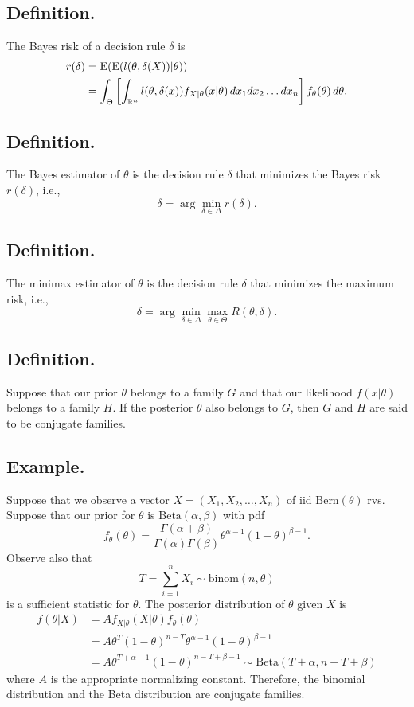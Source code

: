 \documentclass[titlepage]{article}
\begin{document}
\subsection{Definition.} The Bayes risk of a decision rule $\delta$ is 
\begin{align*}
    r(\delta) &= \text{E}(\text{E}(l(\theta, \delta(X))|\theta)) \\
              &= \int_{\Theta}\left[\int_{\mathbb{R}^{n}}l(\theta, \delta(x))f_{X|\theta}(x|\theta)\, dx_{1}dx_{2}\ldots dx_{n}\right]f_{\theta}(\theta)\, d\theta.
\end{align*}

\subsection{Definition.} The Bayes estimator of $\theta$ is the decision rule $\delta$ that minimizes the Bayes risk $r(\delta)$, i.e., 
$$\delta = \arg\min_{\delta\in\Delta}r(\delta).$$

\subsection{Definition.} The minimax estimator of $\theta$ is the decision rule $\delta$ that minimizes the maximum risk, i.e., 
$$\delta = \arg\min_{\delta\in\Delta}\max_{\theta\in\Theta}R(\theta, \delta).$$

\subsection{Definition.} Suppose that our prior $\theta$ belongs to a family $G$ and that our likelihood $f(x|\theta)$ belongs to a family $H$. If the posterior $\theta$ also belongs to $G$, then $G$ and $H$ are said to be conjugate families.

\subsection{Example.} Suppose that we observe a vector $X = (X_{1}, X_{2}, \ldots, X_{n})$ of iid $\text{Bern}(\theta)$ rvs. Suppose that our prior for $\theta$ is $\text{Beta}(\alpha, \beta)$ with pdf
$$f_{\theta}(\theta) = \frac{\Gamma(\alpha+\beta)}{\Gamma(\alpha)\Gamma(\beta)}\theta^{\alpha-1}(1-\theta)^{\beta-1}.$$
Observe also that 
$$T = \sum_{i=1}^{n}X_{i} \sim \text{binom}(n, \theta)$$
is a sufficient statistic for $\theta$. The posterior distribution of $\theta$ given $X$ is 
\begin{align*}
    f(\theta|X) &= Af_{X|\theta}(X|\theta)f_{\theta}(\theta) \\
                &= A\theta^{T}(1-\theta)^{n-T}\theta^{\alpha-1}(1-\theta)^{\beta-1} \\
                &= A\theta^{T+\alpha-1}(1-\theta)^{n-T+\beta-1} \sim \text{Beta}(T+\alpha, n-T+\beta)
\end{align*}
where $A$ is the appropriate normalizing constant. Therefore, the binomial distribution and the Beta distribution are conjugate families.
\end{document}
